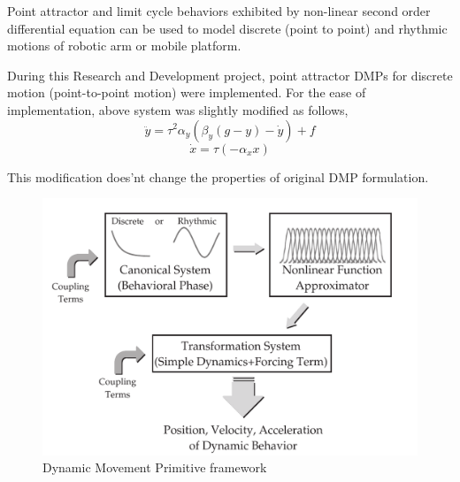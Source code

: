 \par Point attractor and limit cycle behaviors exhibited by non-linear second order differential equation can be used to model discrete (point to point) and rhythmic motions of robotic arm or mobile platform.   
\vspace{0.5cm}

During this Research and Development project, point attractor DMPs for discrete motion (point-to-point motion) were implemented. For the ease of implementation, above system was slightly modified as follows, 
\begin{equation}\label{actual_DMP}
	\ddot{y} = \tau^{2}\alpha_{y}(\beta_{y}(g-y)-\dot{y}) + f
\end{equation}
\begin{equation}
	\dot{x} = \tau(-\alpha_{x}x)
\end{equation}

This modification does'nt change the properties of original DMP formulation.
\begin{figure}[H]
	\includegraphics[width=\textwidth]{images/dmp.png}
	\caption{Dynamic Movement Primitive framework}
	\label{fig:DMP_framework}
\end{figure}

